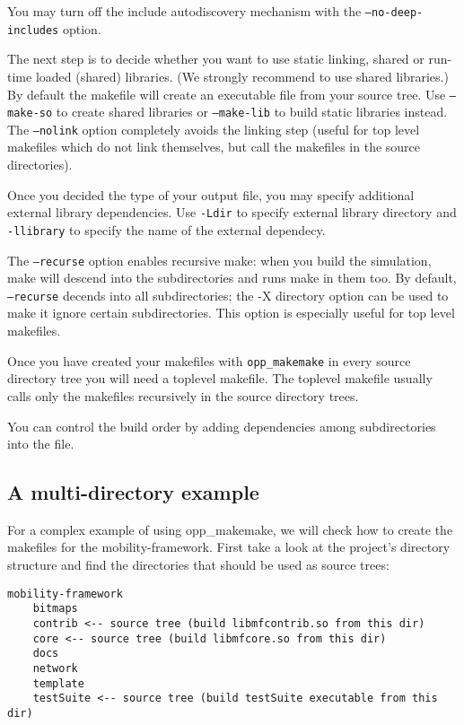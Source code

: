 \begin{note}
You may turn off the include autodiscovery mechanism with the \texttt{--no-deep-includes} option.
\end{note}

The next step is to decide whether you want to use static linking,
shared or run-time loaded (shared) libraries. (We strongly
recommend to use shared libraries.) By default the makefile will create an executable
file from your source tree. Use \texttt{--make-so} to create shared libraries
or \texttt{--make-lib} to build static libraries instead. The \texttt{--nolink}
option completely avoids the linking step (useful for top level makefiles which do
not link themselves, but call the makefiles in the source directories).

Once you decided the type of your output file, you may specify additional external library
dependencies. Use \texttt{-Ldir} to specify external library directory and \texttt{-llibrary}
to specify the name of the external dependecy.

The \texttt{--recurse} option enables recursive make: when you build the simulation, make
will descend into the subdirectories and runs make in them too.
By default, \texttt{--recurse} decends into all subdirectories; the -X directory option
can be used to make it ignore certain subdirectories. This option is especially useful
for top level makefiles.

Once you have created your makefiles with \texttt{opp\_makemake} in every source directory tree
you will need a toplevel makefile. The toplevel makefile usually calls only the makefiles
recursively in the source directory trees.

You can control the build order by adding dependencies among subdirectories
into the  file.

\subsection{A multi-directory example}

For a complex example of using opp\_makemake, we will check how to create
the makefiles for the mobility-framework. First take a look at the
project's directory structure and find the directories that should be used as
source trees:

\begin{verbatim}
mobility-framework
    bitmaps
    contrib <-- source tree (build libmfcontrib.so from this dir)
    core <-- source tree (build libmfcore.so from this dir)
    docs
    network
    template
    testSuite <-- source tree (build testSuite executable from this dir)
\end{verbatim}

